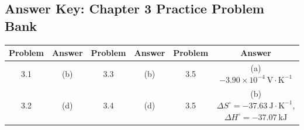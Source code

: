 \ifshowsolutions
\else
\newpage
\subsection*{Answer Key: Chapter 3 Practice Problem Bank}

\begin{center}
\renewcommand{\arraystretch}{1.3}
\begin{tabular}{|c|c||c|c||c|c|}
\hline
\textbf{Problem} & \textbf{Answer} & \textbf{Problem} & \textbf{Answer} & \textbf{Problem} & \textbf{Answer} \\
\hline
3.1 & (b) & 3.3 & (b) & 3.5 & (a) $-3.90 \times 10^{-4}\ \text{V}\cdot\text{K}^{-1}$ \\
3.2 & (d) & 3.4 & (d) & 3.5 & (b) $\Delta S^\circ = -37.63\ \text{J}\cdot\text{K}^{-1}$, $\Delta H^\circ = -37.07\ \text{kJ}$ \\
\hline
\end{tabular}
\end{center}
\fi
